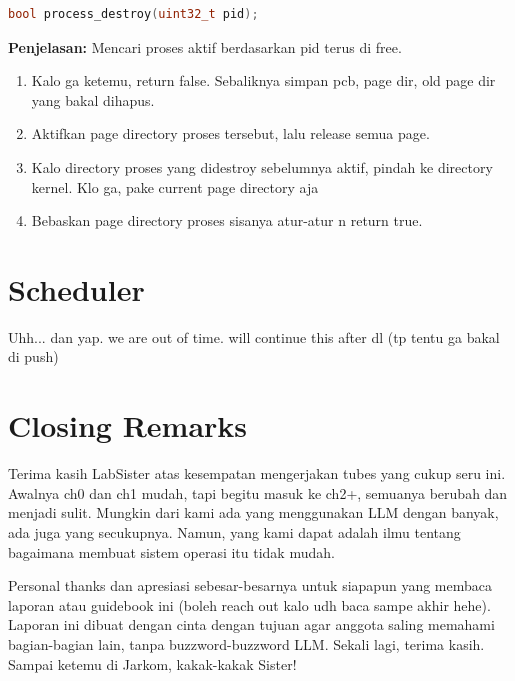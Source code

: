 \begin{lstlisting}[language=c]
bool process_destroy(uint32_t pid);
\end{lstlisting}

\textbf{Penjelasan:} Mencari proses aktif berdasarkan pid terus di free.
\begin{enumerate}
    \item Kalo ga ketemu, return false. Sebaliknya simpan pcb, page dir, old page dir yang bakal dihapus.
    \item Aktifkan page directory proses tersebut, lalu release semua page.
    \item Kalo directory proses yang didestroy sebelumnya aktif, pindah ke directory kernel. Klo ga, pake current page directory aja
    \item Bebaskan page directory proses sisanya atur-atur n return true.
\end{enumerate}

\section{Scheduler}

Uhh... dan yap. we are out of time. will continue this after dl (tp tentu ga bakal di push)

\section{Closing Remarks}

Terima kasih LabSister atas kesempatan mengerjakan tubes yang cukup seru ini. Awalnya ch0 dan ch1 mudah, tapi begitu masuk ke ch2+, semuanya berubah dan menjadi sulit. Mungkin dari kami ada yang menggunakan LLM dengan banyak, ada juga yang secukupnya. Namun, yang kami dapat adalah ilmu tentang bagaimana membuat sistem operasi itu tidak mudah.

Personal thanks dan apresiasi sebesar-besarnya untuk siapapun yang membaca laporan atau guidebook ini (boleh reach out kalo udh baca sampe akhir hehe). Laporan ini dibuat dengan cinta dengan tujuan agar anggota saling memahami bagian-bagian lain, tanpa buzzword-buzzword LLM. Sekali lagi, terima kasih. Sampai ketemu di Jarkom, kakak-kakak Sister!
